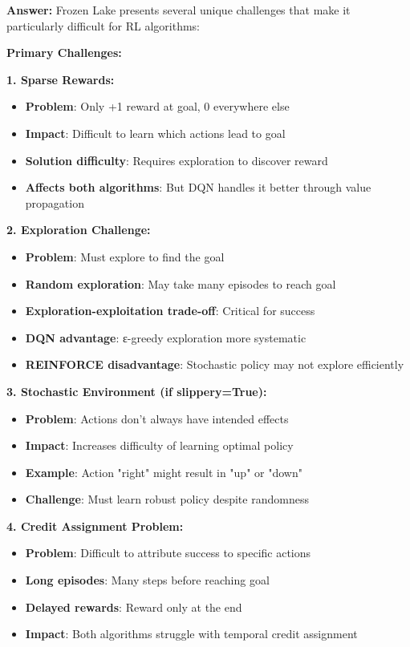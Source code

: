 \documentclass[12pt]{article}
\begin{document}
{{{\textbf{Answer:} Frozen Lake presents several unique challenges that make it particularly difficult for RL algorithms:

\textbf{Primary Challenges:}

\textbf{1. Sparse Rewards:}
\begin{itemize}
    \item \textbf{Problem}: Only +1 reward at goal, 0 everywhere else
    \item \textbf{Impact}: Difficult to learn which actions lead to goal
    \item \textbf{Solution difficulty}: Requires exploration to discover reward
    \item \textbf{Affects both algorithms}: But DQN handles it better through value propagation
\end{itemize}

\textbf{2. Exploration Challenge:}
\begin{itemize}
    \item \textbf{Problem}: Must explore to find the goal
    \item \textbf{Random exploration}: May take many episodes to reach goal
    \item \textbf{Exploration-exploitation trade-off}: Critical for success
    \item \textbf{DQN advantage}: ε-greedy exploration more systematic
    \item \textbf{REINFORCE disadvantage}: Stochastic policy may not explore efficiently
\end{itemize}

\textbf{3. Stochastic Environment (if slippery=True):}
\begin{itemize}
    \item \textbf{Problem}: Actions don't always have intended effects
    \item \textbf{Impact}: Increases difficulty of learning optimal policy
    \item \textbf{Example}: Action "right" might result in "up" or "down"
    \item \textbf{Challenge}: Must learn robust policy despite randomness
\end{itemize}

\textbf{4. Credit Assignment Problem:}
\begin{itemize}
    \item \textbf{Problem}: Difficult to attribute success to specific actions
    \item \textbf{Long episodes}: Many steps before reaching goal
    \item \textbf{Delayed rewards}: Reward only at the end
    \item \textbf{Impact}: Both algorithms struggle with temporal credit assignment
\end{itemize}

}}}
\end{document}
